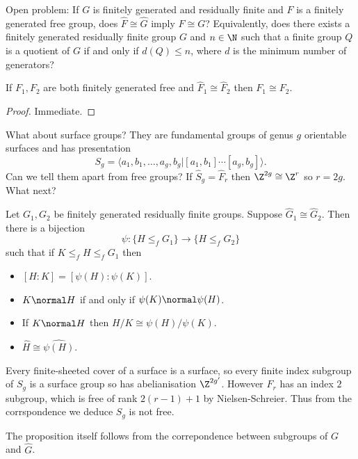 \documentclass[a4paper]{article}
\begin{document}
Open problem: If \(G\) is finitely generated and residually finite and \(F\) is a finitely generated free group, does \(\hat F \cong \hat G\) imply \(F \cong G\)? Equivalently, does there exists a finitely generated residually finite group \(G\) and \(n \in \N\) such that a finite group \(Q\) is a quotient of \(G\) if and only if \(d(Q) \leq n\), where \(d\) is the minimum number of generators?

\begin{proposition}
  If \(F_1, F_2\) are both finitely generated free and \(\hat F_1 \cong \hat F_2\) then \(F_1 \cong F_2\).
\end{proposition}

\begin{proof}
  Immediate.
\end{proof}

What about surface groups? They are fundamental groups of genus \(g\) orientable surfaces and has presentation
\[
  S_g = \langle a_1, b_1, \dots, a_g, b_g| [a_1, b_1] \cdots [a_g, b_g]\rangle.
\]
Can we tell them apart from free groups? If \(\hat S_g = \hat F_r\) then \(\Z^{2g} \cong \Z^r\) so \(r = 2g\). What next?

\begin{proposition}
  Let \(G_1, G_2\) be finitely generated residually finite groups. Suppose \(\hat G_1 \cong \hat G_2\). Then there is a bijection
  \[
    \psi: \{H \leq_f G_1\} \to \{H \leq_f G_2\}
  \]
  such that if \(K \leq_f H \leq_f G_1\) then
  \begin{itemize}
  \item \([H: K] = [\psi(H): \psi(K)]\).
  \item \(K \normal H\) if and only if \(\psi(K) \normal \psi(H)\).
  \item If \(K \normal H\) then \(H/K \cong \psi(H)/\psi(K)\).
  \item \(\hat H \cong \widehat{\psi(H)}\).
  \end{itemize}
\end{proposition}

Every finite-sheeted cover of a surface is a surface, so every finite index subgroup of \(S_g\) is a surface group so has abelianisation \(\Z^{2g'}\). However \(F_r\) has an index \(2\) subgroup, which is free of rank \(2(r - 1) + 1\) by Nielsen-Schreier. Thus from the corrspondence we deduce \(S_g\) is not free.

The proposition itself follows from the correpondence between subgroups of \(G\) and \(\hat G\).
\end{document}
